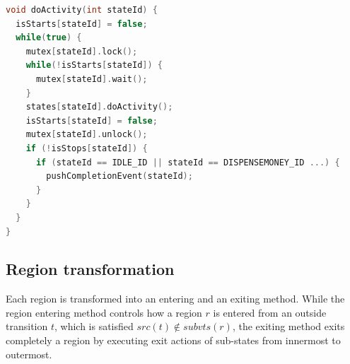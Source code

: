 \begin{minipage}{\columnwidth}
\begin{lstlisting}[caption=Example code generated for doActivity, label=lst:doActivity, language=C++]
void doActivity(int stateId) {
  isStarts[stateId] = false;
  while(true) {
    mutex[stateId].lock();
    while(!isStarts[stateId]) {
      mutex[stateId].wait();
    }
    states[stateId].doActivity();
    isStarts[stateId] = false;
    mutex[stateId].unlock();
    if (!isStops[stateId]) {
      if (stateId == IDLE_ID || stateId == DISPENSEMONEY_ID ...) {
        pushCompletionEvent(stateId);
      }
    }
  }
}
\end{lstlisting}
\end{minipage}

\subsection{Region transformation}
\label{subsubsec:region-trans}
Each region is transformed into an entering and an exiting method. 
While the region entering method controls how a region $r$ is entered from an outside transition $t$, which is satisfied $src(t) \notin subvts(r)$, the exiting method exits completely a region by executing exit actions of sub-states from innermost to outermost.

